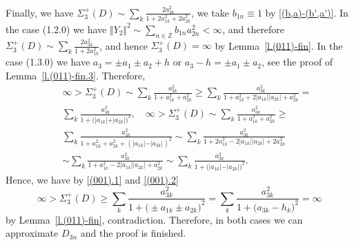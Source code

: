 \documentclass[preprint,12pt]{elsarticle}
\numberwithin{equation}{section}
\begin{document}
\begin{rem}
\label{r.(001)} 
Finally, we have $\Sigma^+_3(D)\!\sim\! \sum_k\frac{2a^2_{3k}}
{1+2a^2_{1k}+2a^2_{2k}}$, we take $b_{1n}\!\equiv\! 1$ by  \eqref{(b,a)-(b',a')}. 
In the case (1.2.0) we have
$\Vert Y_2 \Vert^2\sim
\sum_{n\in \mathbb Z}b_{1n}a_{2n}^2<\infty$, and therefore
$\Sigma^+_3(D)\sim \sum_k\frac{2a^2_{3k}}
{1+2a^2_{1k}}$,  and hence 
$\Sigma^+_3(D)=\infty$ by Lemma~\ref{l.(011)-fin}.
%
In the case (1.3.0) we have $a_3=\pm a_1\pm a_2+h$ or $a_3-h=\pm a_1\pm a_2$,
see the proof of  Lemma~\ref{l.(011)-fin.3}.
Therefore,
\begin{eqnarray}
\nonumber
&&
\infty>\Sigma^+_3(D)\sim 
\sum_k\frac{a^2_{3k}}
{1+a^2_{1k}+a^2_{2k}}\geq
\sum_k\frac{a^2_{3k}}
{1+a^2_{1k}+2\vert a_{1k}\vert \vert a_{2k}\vert +a^2_{2k}}=
\\
\label{(001).1}
&&
\sum_k\frac{a^2_{3k}}
{1+\big(\vert a_{1k} \vert +\vert a_{2k}\vert \big)^2},\quad \infty>\Sigma^+_3(D)\sim 
\sum_k\frac{a^2_{3k}}
{1+a^2_{1k}+a^2_{2k}}\geq\\
\nonumber
&&
\sum_k\frac{a^2_{3k}}
{1+a^2_{1k}+a^2_{2k} +(\vert a_{1k}\vert-\vert a_{2k}\vert)^2
}\sim\sum_k\frac{a^2_{3k}}
{1+2a^2_{1k}-2\vert a_{1k}\vert \vert a_{2k}\vert +2a^2_{2k}}\\
\label{(001).2}
&&
\sim
\sum_k\frac{a^2_{3k}}
{1+a^2_{1k}-2\vert a_{1k}\vert \vert a_{2k}\vert +a^2_{2k}}\sim
\sum_k\frac{a^2_{3k}}
{1+\big(\vert a_{1k} \vert -\vert a_{2k}\vert \big)^2}.
\end{eqnarray}
Hence, we have by \eqref{(001).1} and \eqref{(001).2}  
\begin{equation}
\infty>\Sigma^+_3(D)\geq
\sum_k\frac{a^2_{3k}}
{1+\big(\pm a_{1k}\pm a_{2k}\big)^2}
=\sum_k\frac{a^2_{3k}}
{1+\big( a_{3k}-h_{k}\big)^2}=\infty 
\end{equation}
by Lemma~\ref{l.(011)-fin}, contradiction.
Therefore, in both cases we can approximate $D_{3n}$ and the proof is finished.
\end{rem}
\end{document}
